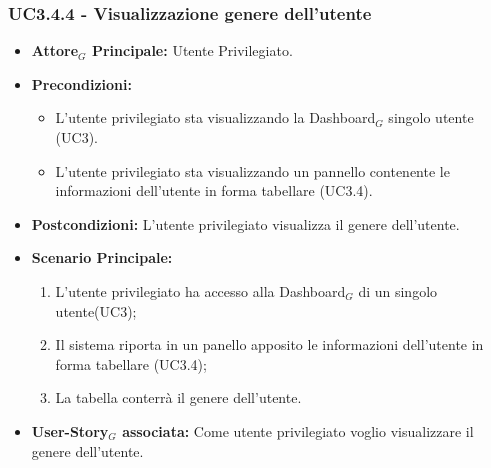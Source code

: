 \documentclass[11pt]{article}
\begin{document}
\begin{justify}
\subsubsection{\textbf{UC3.4.4 - Visualizzazione genere dell'utente}}
\label{UC3.4.4}
\begin{itemize}
     \item \textbf{Attore$_G$ Principale:} Utente Privilegiato.
     \item \textbf{Precondizioni:}
        \begin{itemize}
    	\item L'utente privilegiato sta visualizzando la Dashboard$_G$ singolo utente (UC3).
          \item L'utente privilegiato sta visualizzando un pannello contenente le informazioni dell'utente in forma tabellare (UC3.4).
        \end{itemize}
      \item \textbf{Postcondizioni:} L'utente privilegiato visualizza il genere dell'utente.
      \item \textbf{Scenario Principale:}
        \begin{enumerate}
            \item L'utente privilegiato ha accesso alla Dashboard$_G$ di un singolo utente(UC3);
            \item Il sistema riporta  in un panello apposito le informazioni dell'utente in forma tabellare (UC3.4);
            \item La tabella conterrà il genere dell'utente.
        \end{enumerate}
     \item \textbf{User-Story$_G$ associata:}
       Come utente privilegiato voglio visualizzare il genere dell'utente.
\end{itemize}


\end{justify}
\end{document}
